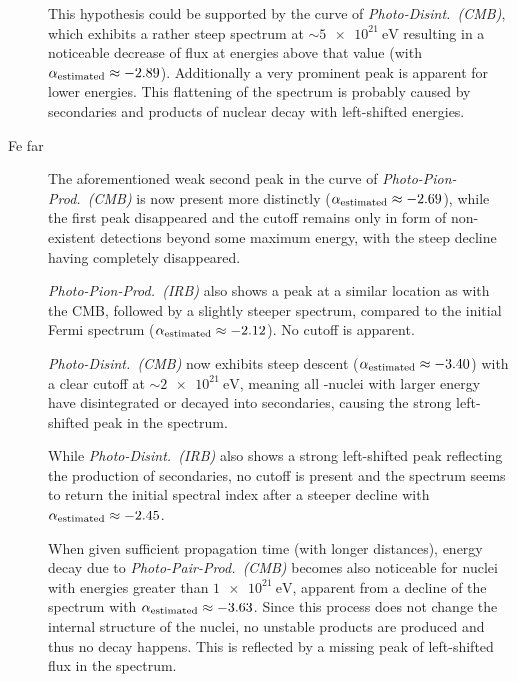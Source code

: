 \begin{description}
        This hypothesis could be supported by the curve of
        \emph{Photo-Disint.~(CMB)}, which exhibits a rather steep spectrum
        at $\sim\SI{5e21}{\electronvolt}$ resulting in a noticeable decrease
        of flux at energies above that value (with
        $\alpha_{\mathrm{estimated}}\approx-2.89$). Additionally a very prominent peak is
        apparent for lower energies. This flattening of the spectrum
        is probably caused by secondaries and products of nuclear
        decay with left-shifted energies.

    \item[Fe far]
        The aforementioned weak second peak in the curve of
        \emph{Photo-Pion-Prod.~(CMB)} is now present more distinctly
        ($\alpha_{\mathrm{estimated}}\approx-2.69$), while the first peak disappeared and the
        cutoff remains only in form of non-existent detections beyond some
        maximum energy, with the steep decline having completely disappeared.

        \emph{Photo-Pion-Prod.~(IRB)} also shows a peak at a similar
        location as with the CMB, followed by a slightly steeper spectrum,
        compared to the initial Fermi spectrum ($\alpha_{\mathrm{estimated}}\approx-2.12$).
        No cutoff is apparent.

        \emph{Photo-Disint.~(CMB)} now exhibits steep descent
        ($\alpha_{\mathrm{estimated}}\approx-3.40$) with a clear cutoff at
        $\sim\SI{2e21}{\electronvolt}$, meaning all \Fe-nuclei with larger
        energy have disintegrated or decayed into secondaries, causing the
        strong left-shifted peak in the spectrum.

        While \emph{Photo-Disint.~(IRB)} also shows a strong left-shifted
        peak reflecting the production of secondaries, no cutoff is present
        and the spectrum seems to return the initial spectral index after a
        steeper decline with $\alpha_{\mathrm{estimated}}\approx-2.45$.

        When given sufficient propagation time (with longer distances),
        energy decay due to \emph{Photo-Pair-Prod.~(CMB)} becomes also
        noticeable for nuclei with energies greater than
        $\SI{1e21}{\electronvolt}$, apparent from a decline of the spectrum
        with $\alpha_{\mathrm{estimated}}\approx-3.63$. Since this process does not change
        the internal structure of the nuclei, no unstable products are produced
        and thus no decay happens. This is reflected by a missing peak of
        left-shifted flux in the spectrum.

\end{description}


